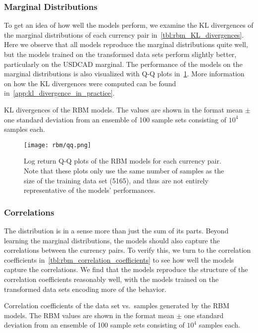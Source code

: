 \subsubsection{Marginal Distributions}
To get an idea of how well the models perform, we examine the KL divergences of the marginal distributions of each currency pair in~\cref{tbl:rbm_KL_divergences}.
Here we observe that all models reproduce the marginal distributions quite well, but the models trained on the transformed data sets perform slightly better, particularly on the USDCAD marginal.
The performance of the models on the marginal distributions is also visualized with Q-Q plots in~\cref{fig:rbm_qq_plots}.
More information on how the KL divergences were computed can be found in~\cref{app:kl_divergence_in_practice}.
\begin{table}[!htb]
    \centering
    \begin{adjustbox}{max width=\textwidth}
        
    \end{adjustbox}
    \caption{
        KL divergences of the RBM models.
        The values are shown in the format mean \(\pm\) one standard deviation from an ensemble of 100 sample sets consisting of \( 10^4 \) samples each.
    }
    \label{tbl:rbm_KL_divergences}
\end{table}
\begin{figure}[!htb]
    \begin{center}
        \texttt{[image: rbm/qq.png]}
    \end{center}
    \caption{Log return Q-Q plots of the RBM models for each currency pair. Note that these plots only use the same number of samples as the size of the training data set (5165), and thus are not entirely representative of the models' performances.}
    \label{fig:rbm_qq_plots}
\end{figure}

\subsubsection{Correlations}
The distribution is in a sense more than just the sum of its parts.
Beyond learning the marginal distributions, the models should also capture the correlations between the currency pairs.
To verify this, we turn to the correlation coefficients in~\cref{tbl:rbm_correlation_coefficients} to see how well the models capture the correlations.
We find that the models reproduce the structure of the correlation coefficients reasonably well, with the models trained on the transformed data sets encoding more of the behavior.
\begin{table}[!htb]
    \centering
    \begin{adjustbox}{max width=\textwidth}
        
    \end{adjustbox}
    \caption{Correlation coefficients of the data set vs.~samples generated by the RBM models. The RBM values are shown in the format mean \(\pm\) one standard deviation from an ensemble of 100 sample sets consisting of \( 10^4 \) samples each.}
    \label{tbl:rbm_correlation_coefficients}
\end{table}

